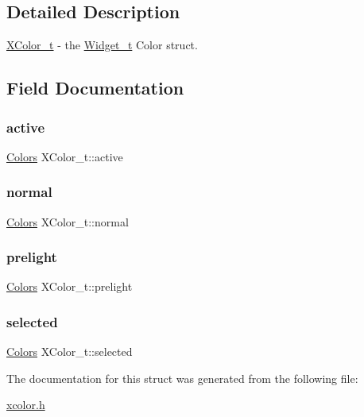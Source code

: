 \subsection{Detailed Description}
\hyperlink{structXColor__t}{X\+Color\+\_\+t} -\/ the \hyperlink{structWidget__t}{Widget\+\_\+t} Color struct. 

\subsection{Field Documentation}
\mbox{\label{structXColor__t_aa4d279f22b0e56d8b590a0beb34101e4}} 
\subsubsection{\texorpdfstring{active}{active}}
{\footnotesize\ttfamily \hyperlink{structColors}{Colors} X\+Color\+\_\+t\+::active}

\mbox{\label{structXColor__t_a56d55140d2797460ac1d0253163d6f66}} 
\subsubsection{\texorpdfstring{normal}{normal}}
{\footnotesize\ttfamily \hyperlink{structColors}{Colors} X\+Color\+\_\+t\+::normal}

\mbox{\label{structXColor__t_ac1bfe871ca6e4d1926b902b38f70d649}} 
\subsubsection{\texorpdfstring{prelight}{prelight}}
{\footnotesize\ttfamily \hyperlink{structColors}{Colors} X\+Color\+\_\+t\+::prelight}

\mbox{\label{structXColor__t_a7fc75aa694046d6e72ecb206e9188401}} 
\subsubsection{\texorpdfstring{selected}{selected}}
{\footnotesize\ttfamily \hyperlink{structColors}{Colors} X\+Color\+\_\+t\+::selected}



The documentation for this struct was generated from the following file\+:\begin{DoxyCompactItemize}
\item 
\hyperlink{xcolor_8h}{xcolor.\+h}\end{DoxyCompactItemize}
